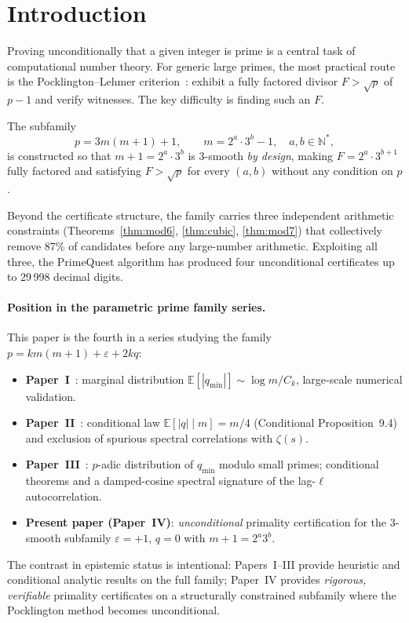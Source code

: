 \documentclass[11pt,a4paper]{article}
\theoremstyle{plain}
\theoremstyle{definition}
\begin{document}
\section{Introduction}
\label{sec:intro}

Proving unconditionally that a given integer is prime is a central task of
computational number theory. For generic large primes, the most practical
route is the Pocklington--Lehmer criterion~\cite{pock,brillhart}: exhibit a
fully factored divisor $F > \sqrt{p}$ of $p - 1$ and verify witnesses. The key
difficulty is finding such an $F$.

The subfamily
\[
p = 3m(m+1) + 1, \qquad m = 2^a \cdot 3^b - 1, \quad a, b \in \mathbb{N}^*,
\]
is constructed so that $m + 1 = 2^a \cdot 3^b$ is 3-smooth \emph{by design},
making $F = 2^a \cdot 3^{b+1}$ fully factored and satisfying $F > \sqrt{p}$
for every $(a, b)$ without any condition on $p$.

Beyond the certificate structure, the family carries three independent
arithmetic constraints (Theorems~\ref{thm:mod6}, \ref{thm:cubic},
\ref{thm:mod7}) that collectively remove 87\% of candidates before any
large-number arithmetic. Exploiting all three, the PrimeQuest algorithm has
produced four unconditional certificates up to 29\,998 decimal digits.

\paragraph{Position in the parametric prime family series.}
This paper is the fourth in a series studying the family
$p = km(m+1) + \varepsilon + 2kq$:
\begin{itemize}[leftmargin=*]
\item \textbf{Paper~I}~\cite{paper1}: marginal distribution
$\mathbb{E}[|q_{\min}|] \sim \log m / C_k$, large-scale numerical validation.
\item \textbf{Paper~II}~\cite{paper2}: conditional law
$\mathbb{E}[|q| \mid m] = m/4$ (Conditional Proposition~9.4) and exclusion of
spurious spectral correlations with $\zeta(s)$.
\item \textbf{Paper~III}~\cite{paper3}: $p$-adic distribution of $q_{\min}$
modulo small primes; conditional theorems and a damped-cosine spectral
signature of the lag-$\ell$ autocorrelation.
\item \textbf{Present paper (Paper~IV)}: \emph{unconditional} primality
certification for the 3-smooth subfamily $\varepsilon = +1$, $q = 0$ with
$m + 1 = 2^a 3^b$.
\end{itemize}
The contrast in epistemic status is intentional: Papers~I--III provide
heuristic and conditional analytic results on the full family; Paper~IV
provides \emph{rigorous, verifiable} primality certificates on a structurally
constrained subfamily where the Pocklington method becomes unconditional.
\end{document}
